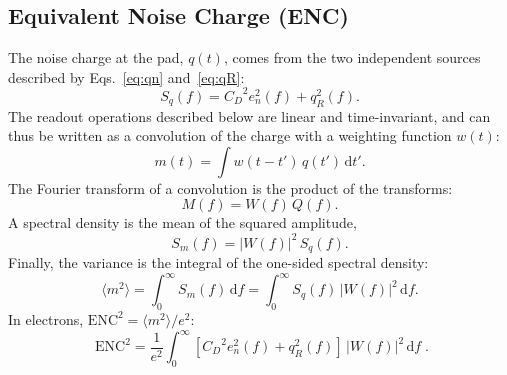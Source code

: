 \documentclass[11pt,a4paper]{article}
\newcommand{\dd}{\mathrm{d}}
\newcommand{\CD}{\ensuremath{C_D}}
\begin{document}
\subsection{Equivalent Noise Charge (ENC)}
%
The noise charge at the pad, $q(t)$, comes from the two independent sources described by
Eqs.~\eqref{eq:qn} and~\eqref{eq:qR}:
%
\begin{equation}
 S_q(f)=\CD^2e_n^2(f)+q_R^2(f).
\end{equation}
%
The readout operations described below are linear and time-invariant, and
can thus be written as a convolution of the charge with a weighting
function $w(t)$:
%
\begin{equation}
 m(t)=\int w(t-t')\,q(t')\,\dd t' .
\end{equation}
%
The Fourier transform of a convolution is the product of the transforms:
%
\begin{equation}
 M(f)=W(f)\,Q(f) .
\end{equation}
%
A spectral density is the mean of the squared amplitude,
%
\begin{equation}
 S_m(f)=|W(f)|^2\,S_q(f) .
\end{equation}
%
Finally, the variance is the integral of the one-sided spectral density:
%
\begin{equation}
 \langle m^2\rangle=\int_0^\infty S_m(f)\,\dd f=\int_0^\infty S_q(f)\,|W(f)|^2\,\dd f .
\end{equation}
%
In electrons, $\mathrm{ENC}^2=\langle m^2\rangle/e^2$:
%
\begin{equation}
 \boxed{\;\mathrm{ENC}^2 = \frac{1}{e^2}\int_0^\infty
 \left[\CD^2 e_n^2(f) + q_R^2(f)\right]\,|W(f)|^2\,\dd f\;} .
\label{eq:enc}
\end{equation}
%

\end{document}
